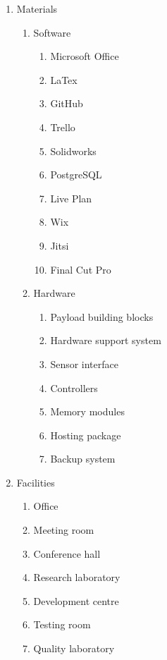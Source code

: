 \begin{enumerate}[label*=\arabic*.]
	\item Materials
		\begin{enumerate}[label*=\arabic*.]
			\item Software
			\begin{enumerate}[label*=\arabic*.]
				\item Microsoft Office
				\item LaTex
				\item GitHub
				\item Trello
				\item Solidworks
				\item PostgreSQL
				\item Live Plan
				\item Wix
				\item Jitsi
				\item Final Cut Pro
			\end{enumerate}
			\item Hardware
			\begin{enumerate}[label*=\arabic*.]
				\item Payload building blocks
				\item Hardware support system
				\item Sensor interface
				\item Controllers
				\item Memory modules
				\item Hosting package
				\item Backup system
			\end{enumerate}
		\end{enumerate}
	
	\item Facilities
		\begin{enumerate}[label*=\arabic*.]
		\item Office
		\item Meeting room
		\item Conference hall
		\item Research laboratory
		\item Development centre
		\item Testing room
		\item Quality laboratory
		\end{enumerate}
	
\end{enumerate}

